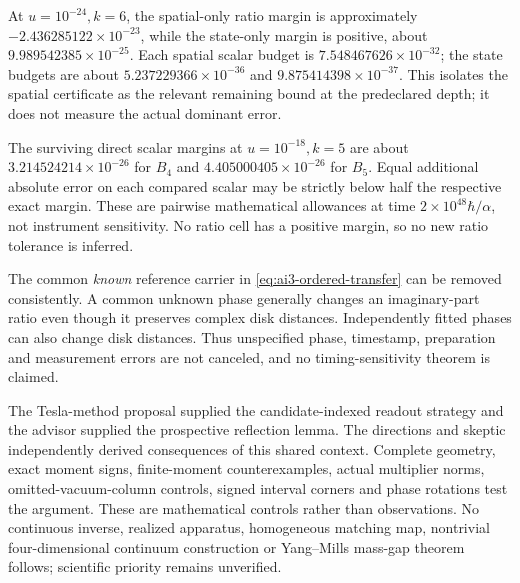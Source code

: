 At $u=10^{-24},k=6$, the spatial-only ratio margin is approximately $-2.436285122\times10^{-23}$, while the state-only margin is positive, about $9.989542385\times10^{-25}$. Each spatial scalar budget is $7.548467626\times10^{-32}$; the state budgets are about $5.237229366\times10^{-36}$ and $9.875414398\times10^{-37}$. This isolates the spatial certificate as the relevant remaining bound at the predeclared depth; it does not measure the actual dominant error.

The surviving direct scalar margins at $u=10^{-18},k=5$ are about $3.214524214\times10^{-26}$ for $B_4$ and $4.405000405\times10^{-26}$ for $B_5$. Equal additional absolute error on each compared scalar may be strictly below half the respective exact margin. These are pairwise mathematical allowances at time $2\times10^{48}\hbar/\alpha$, not instrument sensitivity. No ratio cell has a positive margin, so no new ratio tolerance is inferred.

The common \emph{known} reference carrier in \eqref{eq:ai3-ordered-transfer} can be removed consistently. A common unknown phase generally changes an imaginary-part ratio even though it preserves complex disk distances. Independently fitted phases can also change disk distances. Thus unspecified phase, timestamp, preparation and measurement errors are not canceled, and no timing-sensitivity theorem is claimed.

The Tesla-method proposal supplied the candidate-indexed readout strategy and the advisor supplied the prospective reflection lemma. The directions and skeptic independently derived consequences of this shared context. Complete geometry, exact moment signs, finite-moment counterexamples, actual multiplier norms, omitted-vacuum-column controls, signed interval corners and phase rotations test the argument. These are mathematical controls rather than observations. No continuous inverse, realized apparatus, homogeneous matching map, nontrivial four-dimensional continuum construction or Yang--Mills mass-gap theorem follows; scientific priority remains unverified.
